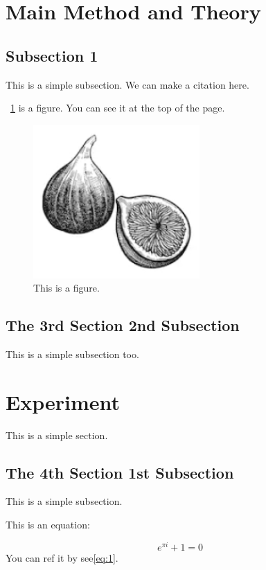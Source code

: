 \documentclass[lettersize,journal,12pt]{IEEEtran}
\begin{document}
\section{Main Method and Theory}



\subsection{Subsection 1}

This is a simple subsection.
We can make a citation here. \cite{ref1}

\figurename~\ref{fig2} is a figure. You can see it at the top of the page.

\begin{figure}[!t]
	\centering
	\includegraphics[width=2.5in]{images/fig1.png}
	\caption{This is a figure.}
	\label{fig2}
\end{figure}

\subsection{The 3rd Section 2nd Subsection}

This is a simple subsection too.
\section{Experiment}

This is a simple section.
\subsection{The 4th Section 1st Subsection}

This is a simple subsection.

This is an equation:

\begin{equation}
	\label{eq:1}
	e^{\pi i} + 1 = 0
\end{equation}
You can ref it by see\eqref{eq:1}.
\end{document}
